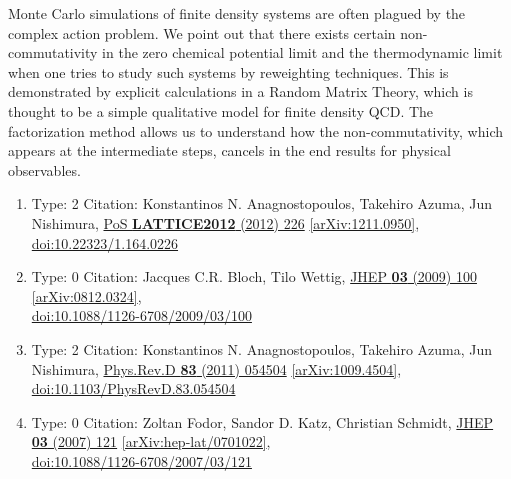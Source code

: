 \documentclass[a4paper,10pt]{article}
\begin{document}
\begin{enumerate}
Monte Carlo simulations of finite density systems are often plagued by the complex action problem. We point out that there exists certain non-commutativity in the zero chemical potential limit and the thermodynamic limit when one tries to study such systems by reweighting techniques. This is demonstrated by explicit calculations in a Random Matrix Theory, which is thought to be a simple qualitative model for finite density QCD. The factorization method allows us to understand how the non-commutativity, which appears at the intermediate steps, cancels in the end results for physical observables.
\begin{enumerate}
  \item Type: 2 Citation: Konstantinos N. Anagnostopoulos, Takehiro Azuma, Jun Nishimura, \href{https://www.doi.org/10.22323/1.164.0226}{PoS {\bf LATTICE2012} (2012) 226}  \href{https://arxiv.org/abs/1211.0950}{[arXiv:1211.0950]},\\\href{https://www.doi.org/10.22323/1.164.0226}{doi:10.22323/1.164.0226}
  \item Type: 0 Citation: Jacques C.R. Bloch, Tilo Wettig, \href{https://www.doi.org/10.1088/1126-6708/2009/03/100}{JHEP {\bf 03} (2009) 100}  \href{https://arxiv.org/abs/0812.0324}{[arXiv:0812.0324]},\\\href{https://www.doi.org/10.1088/1126-6708/2009/03/100}{doi:10.1088/1126-6708/2009/03/100}
  \item Type: 2 Citation: Konstantinos N. Anagnostopoulos, Takehiro Azuma, Jun Nishimura, \href{https://www.doi.org/10.1103/PhysRevD.83.054504}{Phys.Rev.D {\bf 83} (2011) 054504}  \href{https://arxiv.org/abs/1009.4504}{[arXiv:1009.4504]},\\\href{https://www.doi.org/10.1103/PhysRevD.83.054504}{doi:10.1103/PhysRevD.83.054504}
  \item Type: 0 Citation: Zoltan Fodor, Sandor D. Katz, Christian Schmidt, \href{https://www.doi.org/10.1088/1126-6708/2007/03/121}{JHEP {\bf 03} (2007) 121}  \href{https://arxiv.org/abs/hep-lat/0701022}{[arXiv:hep-lat/0701022]},\\\href{https://www.doi.org/10.1088/1126-6708/2007/03/121}{doi:10.1088/1126-6708/2007/03/121}

\end{enumerate}
\end{enumerate}
\end{document}
